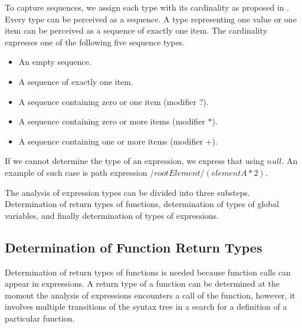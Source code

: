 
To capture sequences, we assign each type with its cardinality as proposed in . Every type can be perceived as a sequence. A type representing one value or one item can be perceived as a sequence of exactly one item. The cardinality expresses one of the following five sequence types.

\begin{itemize}
\item An empty sequence.
\item A sequence of exactly one item.
\item A sequence containing zero or one item (modifier $?$).
\item A sequence containing zero or more items (modifier $*$).
\item A sequence containing one or more items (modifier $+$).
\end{itemize}

If we cannot determine the type of an expression, we express that using $null$. An example of such case is path expression $/rootElement/(elementA * 2)$. 

The analysis of expression types can be divided into three substeps. Determination of return types of functions, determination of types of global variables, and finally determination of types of expressions.


\subsection{Determination of Function Return Types}
Determination of return types of functions is needed because function calls can appear in expressions. A return type of a function can be determined at the moment the analysis of expressions encounters a call of the function, however, it involves multiple transitions of the syntax tree in a search for a definition of a particular function.


